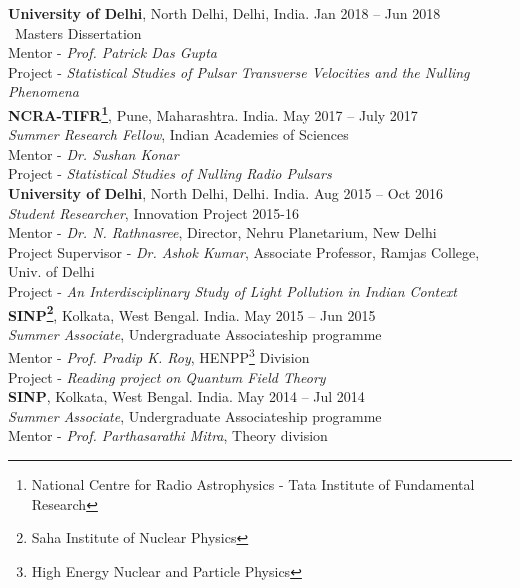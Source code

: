 {\bf University of Delhi}, North Delhi, Delhi, India. \hfill{Jan 2018 -- Jun 2018}\\
{\ Masters Dissertation}\\
Mentor - {\em Prof. Patrick Das Gupta}\\
Project - {\em Statistical Studies of Pulsar Transverse Velocities and the Nulling Phenomena}\\

{\bf NCRA-TIFR\footnote{National Centre for Radio Astrophysics - Tata Institute of Fundamental Research}}, Pune, Maharashtra. India. \hfill{May 2017 -- July 2017}\\
{\em Summer Research Fellow}, Indian Academies of Sciences\\
Mentor - {\em Dr. Sushan Konar}\\
Project - {\em Statistical Studies of Nulling Radio Pulsars}\\

{\bf University of Delhi}, North Delhi, Delhi. India. \hfill{Aug 2015 -- Oct 2016}\\
{\em Student Researcher}, Innovation Project 2015-16\\
Mentor - {\em Dr. N. Rathnasree}, Director, Nehru Planetarium, New Delhi\\
Project Supervisor - {\em Dr. Ashok Kumar}, Associate Professor, Ramjas College, Univ. of Delhi\\
Project - {\em An Interdisciplinary Study of Light Pollution in Indian Context}\\

{\bf SINP\footnote{Saha Institute of Nuclear Physics}}, Kolkata, West Bengal. India. \hfill{May 2015 -- Jun 2015}\\
{\em Summer Associate}, Undergraduate Associateship programme\\
Mentor - {\em Prof. Pradip K. Roy}, HENPP\footnote{High Energy Nuclear and Particle Physics} Division\\
Project - {\em Reading project on Quantum Field Theory}\\

{\bf SINP}, Kolkata, West Bengal. India. \hfill{May 2014 -- Jul 2014}\\
{\em Summer Associate}, Undergraduate Associateship programme\\
Mentor - {\em Prof. Parthasarathi Mitra}, Theory division\\
